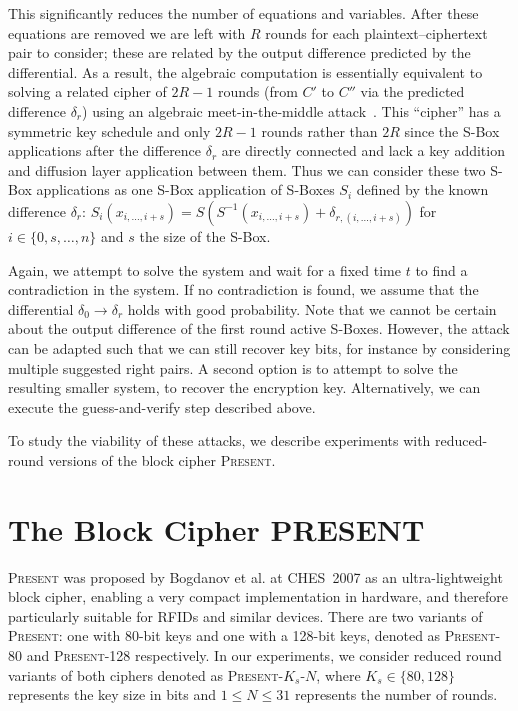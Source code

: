 \documentclass{llncs}
\newcommand{\PRESENT}{\textsc{Present}\xspace}
\begin{document}
This significantly reduces the number of equations and variables. After
these equations are removed we are left with $R$ rounds for each
plaintext--ciphertext pair to consider; these are related 
by the output difference predicted by the differential. 
As a result, the algebraic computation is essentially equivalent to solving
a related cipher of $2R-1$ rounds (from $C'$ to $C''$ via the predicted
difference $\delta_r$) using an algebraic meet-in-the-middle
attack~\cite{alg-aes-book}. This ``cipher'' has a symmetric key schedule and
only
$2R-1$ rounds rather than $2R$ since the S-Box applications
after the difference $\delta_r$ are directly connected and lack a key addition
and diffusion layer application between them. Thus we can consider these two
S-Box applications as one S-Box application of S-Boxes $S_{i}$ defined by the 
known difference $\delta_r$: $S_{i}(x_{i,\dots,i+s}) = S(S^{-1}(x_{i,\dots,i+s})
+ \delta_{r,(i,\dots,i+s)})$ for $i \in \{0,s,\dots,n\}$ and $s$ the size of
the S-Box.

Again, we attempt to solve the system and wait for a fixed time $t$ to find a
contradiction in the system. If no contradiction is found, we assume that the
differential $\delta_0 \rightarrow \delta_r$ holds with good probability. Note
that we cannot be
certain about the output difference of the first
round active S-Boxes. However,
the attack can be adapted such that we can still recover key bits,
for instance by considering multiple suggested right pairs. A second option is
to
attempt to solve the resulting smaller system, to recover the encryption key.
Alternatively, we can execute the guess-and-verify step described above.

To study the viability of these attacks, we describe experiments with
reduced-round versions of the block cipher \PRESENT.

\section{The Block Cipher PRESENT}
\label{sec:present}
\textsc{Present} \cite{present} was proposed by Bogdanov et al. at
CHES~2007 as an ultra-lightweight block cipher, enabling a very
compact implementation in hardware, and therefore particularly suitable for RFIDs
and similar devices.
There are two variants of \PRESENT: one with 80-bit keys and one with
a 128-bit keys, denoted as \PRESENT-80 and \PRESENT-128 respectively. In our
experiments, we consider reduced round variants of both ciphers denoted as
\PRESENT-$K_s$-$N$, where $K_s \in \{80, 128\}$ represents the key size in
bits
and $1 \leq N \leq 31$ represents the number of rounds.
\end{document}

